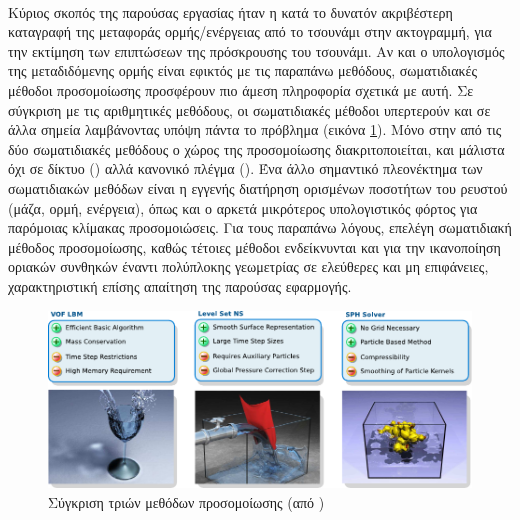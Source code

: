 \paragraph{} Κύριος σκοπός της παρούσας εργασίας ήταν η κατά το δυνατόν ακριβέστερη
καταγραφή της μεταφοράς ορμής/ενέργειας από το τσουνάμι στην ακτογραμμή, για την εκτίμηση
των επιπτώσεων της πρόσκρουσης του τσουνάμι. Αν και ο υπολογισμός της μεταδιδόμενης ορμής
είναι εφικτός με τις παραπάνω μεθόδους, σωματιδιακές μέθοδοι προσομοίωσης προσφέρουν πιο
άμεση πληροφορία σχετικά με αυτή. Σε σύγκριση με τις αριθμητικές μεθόδους, οι σωματιδιακές
μέθοδοι υπερτερούν και σε άλλα σημεία λαμβάνοντας υπόψη πάντα το πρόβλημα (εικόνα
\ref{fig:method-comparison}). Μόνο στην  από τις δύο σωματιδιακές μεθόδους ο
χώρος της προσομοίωσης διακριτοποιείται, και μάλιστα όχι σε δίκτυο () αλλά
κανονικό πλέγμα (). Ένα άλλο σημαντικό πλεονέκτημα των σωματιδιακών μεθόδων
είναι η εγγενής διατήρηση ορισμένων ποσοτήτων του ρευστού (μάζα, ορμή, ενέργεια), όπως και
ο αρκετά μικρότερος υπολογιστικός φόρτος για παρόμοιας κλίμακας προσομοιώσεις. Για τους
παραπάνω λόγους, επελέγη σωματιδιακή μέθοδος προσομοίωσης, καθώς τέτοιες μέθοδοι
εν\-δεί\-κνυ\-νται και για την ικανοποίηση οριακών συνθηκών έναντι πολύπλοκης γεωμετρίας
σε ελεύθερες και μη επιφάνειες, χαρακτηριστική επίσης απαίτηση της παρούσας εφαρμογής.

\begin{figure}[h]
  \centering
  \includegraphics[width=\textwidth]{figures/thuerey-comparison.pdf}
  \caption[Σύγκριση μεθόδων προσομοίωσης] {Σύγκριση τριών μεθόδων προσομοίωσης (από
    ) \cite{thuerey2007}}
  \label{fig:method-comparison}
\end{figure}

\subsection{\texorpdfstring{}{}}
